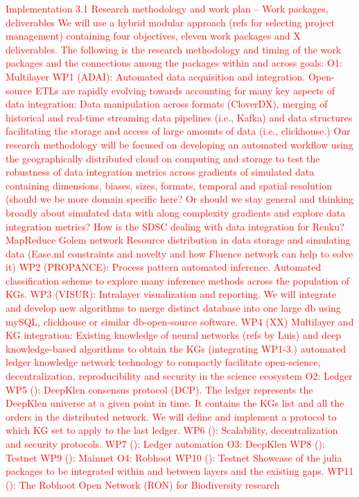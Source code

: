 \documentclass[12pt, a4paper]{article} %
\begin{document}
\textcolor{red}{Implementation 3.1 Research methodology and work plan
  – Work packages, deliverables We will use a hybrid modular approach
  (refs for selecting project management) containing four objectives,
  eleven work packages and X deliverables. The following is the
  research methodology and timing of the work packages and the
  connections among the packages within and across goals: O1:
  Multilayer WP1 (ADAI): Automated data acquisition and
  integration. Open-source ETLs are rapidly evolving towards
  accounting for many key aspects of data integration: Data
  manipulation across formats (CloverDX), merging of historical and
  real-time streaming data pipelines (i.e., Kafka) and data structures
  facilitating the storage and access of large amounts of data (i.e.,
  clickhouse.) Our research methodology will be focused on developing
  an automated workflow using the geographically distributed cloud on
  computing and storage to test the robustness of data integration
  metrics across gradients of simulated data containing dimensions,
  biases, sizes, formats, temporal and spatial resolution (should we
  be more domain specific here? Or should we stay general and thinking
  broadly about simulated data with along complexity gradients and
  explore data integration metrics? How is the SDSC dealing with data
  integration for Renku?  MapReduce Golem network Resource
  distribution in data storage and simulating data (Ease.ml
  constraints and novelty and how Fluence network can help to solve
  it) WP2 (PROPANCE): Process pattern automated inference. Automated
  classification scheme to explore many inference methods across the
  population of KGs.  WP3 (VISUR): Intralayer visualization and
  reporting. We will integrate and develop new algorithms to merge
  distinct database into one large db using mySQL, clickhouse or
  similar db-open-source software.  WP4 (XX) Multilayer and KG
  integration: Existing knowledge of neural networks (refs by Luis)
  and deep knowledge-based algorithms to obtain the KGs (integrating
  WP1-3.)  automated ledger knowledge network technology to compactly
  facilitate open-science, decentralization, reproducibility and
  security in the science ecosystem O2: Ledger WP5 (): DeepKlen
  consensus protocol (DCP). The ledger represents the DeepKlen
  universe at a given point in time. It contains the KGs list and all
  the orders in the distributed network. We will define and implement
  a protocol to which KG set to apply to the last ledger. WP6 ():
  Scalability, decentralization and security protocols.  WP7 ():
  Ledger automation O3: DeepKlen WP8 (): Testnet WP9 (): Mainnet O4:
  Robhoot WP10 (): Testnet Showcase of the julia packages to be
  integrated within and between layers and the existing gaps. WP11 ():
  The Robhoot Open Network (RON) for Biodiversity research}
\end{document}
